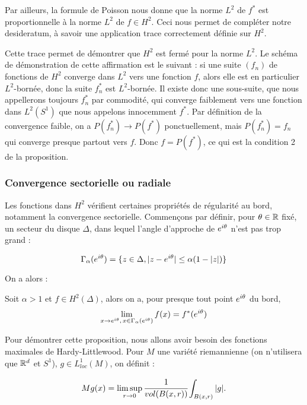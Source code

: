 Par ailleurs, la formule de Poisson nous donne que la norme $L^2$ de $f^*$ est proportionnelle à la norme $L^2$ de $f \in H^2$. Ceci nous permet de compléter notre desideratum, à savoir une application trace correctement définie sur $H^2$.

Cette trace permet de démontrer que  $H^2$ est fermé pour la norme $L^2$. Le schéma de démonstration de cette affirmation est le suivant : si une suite $(f_n)$ de fonctions de $H^2$ converge dans $L^2$ vers une fonction $f$, alors elle est en particulier $L^2$-bornée, donc la suite $f_n^*$ est $L^2$-bornée. Il existe donc une sous-suite, que nous appellerons toujours $f_n^*$ par commodité, qui converge faiblement vers une fonction dans $L^2(S^1)$ que nous appelons innocemment $f^*$. Par définition de la convergence faible, on a $P(f_n^*) \to P(f^*)$ ponctuellement, mais $P(f_n^*) = f_n$ qui converge presque partout vers $f$. Donc $f = P(f^*)$, ce qui est la condition 2 de la proposition.

\subsubsection{Convergence sectorielle ou radiale}

Les fonctions dans $H^2$ vérifient certaines propriétés de régularité au bord, notamment la convergence sectorielle. Commençons par définir, pour $\theta \in \mathbb{R}$ fixé, un secteur du disque $\Delta$, dans lequel l'angle d'approche de $e^{i\theta}$ n'est pas trop grand :

\begin{equation*}
	\Gamma_{\alpha}(e^{i\theta}) = \{z \in \Delta, |z-e^{i\theta}| \leq \alpha (1-|z|)\}
\end{equation*}

On a alors :

\begin{prop}
	Soit $\alpha > 1$ et $f \in H^2(\Delta)$, alors on a, pour presque tout point $e^{i\theta}$ du bord,
	\begin{equation*}
		\lim_{x \to e^{i\theta},\,x \in \Gamma_{\alpha}(e^{i\theta})}f(x) = f^*(e^{i\theta})
	\end{equation*}
\end{prop}

Pour démontrer cette proposition, nous allons avoir besoin des fonctions maximales de Hardy-Littlewood. Pour $M$ une variété riemannienne (on n'utilisera que $\mathbb{R}^d$ et $S^1$), $g \in L^1_{loc}(M)$, on définit :

\begin{equation}
	Mg(x)= \limsup_{r \to 0} \cfrac{1}{vol(B(x,r))}\int_{B(x,r)}|g|.
\end{equation}

